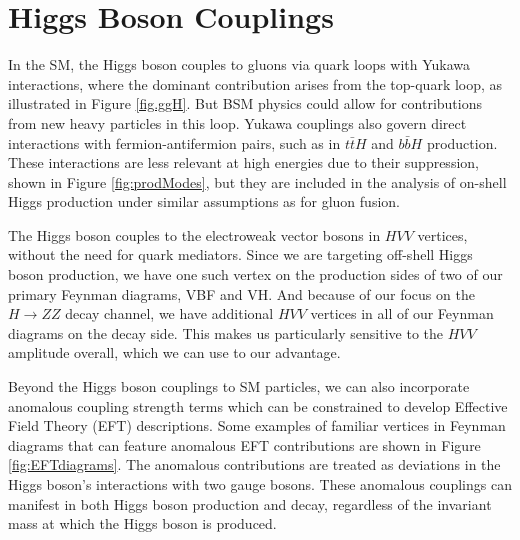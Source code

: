 
\section{Higgs Boson Couplings}

In the SM, the Higgs boson couples to gluons via quark loops with Yukawa interactions, where the dominant contribution arises from the top-quark loop, as illustrated in Figure \ref{fig.ggH}. But BSM physics could allow for contributions from new heavy particles in this loop. %
Yukawa couplings also govern direct interactions with fermion-antifermion pairs, such as in $t\bar{t}H$ and $b\bar{b}H$ production. These interactions are less relevant at high energies due to their suppression, shown in Figure \ref{fig:prodModes}, but they are included in the analysis of on-shell Higgs production under similar assumptions as for gluon fusion.

The Higgs boson couples to the electroweak vector bosons in $HVV$ vertices, without the need for quark mediators. Since we are targeting off-shell Higgs boson production, we have one such vertex on the production sides of two of our primary Feynman diagrams, VBF and VH. And because of our focus on the \( H \to ZZ \) decay channel, we have additional $HVV$ vertices in all of our Feynman diagrams on the decay side. This makes us particularly sensitive to the $HVV$ amplitude overall, which we can use to our advantage.

Beyond the Higgs boson couplings to SM particles, we can also incorporate anomalous coupling strength terms which can be constrained to develop Effective Field Theory (EFT) descriptions. Some examples of familiar vertices in Feynman diagrams that can feature anomalous EFT contributions are shown in Figure \ref{fig:EFTdiagrams}. The anomalous contributions are treated as deviations in the Higgs boson's interactions with two gauge bosons. These anomalous couplings can manifest in both Higgs boson production and decay, regardless of the invariant mass at which the Higgs boson is produced. 

